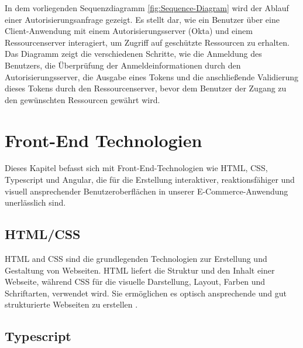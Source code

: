 In dem vorliegenden Sequenzdiagramm \ref{fig:Sequence-Diagram} wird der Ablauf einer Autorisierungsanfrage gezeigt. Es stellt dar, wie ein Benutzer über eine Client-Anwendung mit einem Autorisierungsserver (Okta) und einem Ressourcenserver interagiert, um Zugriff auf geschützte Ressourcen zu erhalten. \\
Das Diagramm zeigt die verschiedenen Schritte, wie die Anmeldung des Benutzers, die Überprüfung der Anmeldeinformationen durch den Autorisierungsserver, die Ausgabe eines Tokens und die anschließende Validierung dieses Tokens durch den Ressourcenserver, bevor dem Benutzer der Zugang zu den gewünschten Ressourcen gewährt wird.

\section{Front-End Technologien}

Dieses Kapitel befasst sich mit Front-End-Technologien wie HTML, CSS, Typescript und Angular, die für die Erstellung interaktiver, reaktionsfähiger und visuell ansprechender Benutzeroberflächen in unserer E-Commerce-Anwendung unerlässlich sind.

\subsection{HTML/CSS}

HTML and CSS sind die grundlegenden Technologien zur Erstellung und Gestaltung von Webseiten. HTML liefert die Struktur und den Inhalt einer Webseite, während CSS für die visuelle Darstellung, Layout, Farben und Schriftarten, verwendet wird. Sie ermöglichen es optisch ansprechende und gut strukturierte Webseiten zu erstellen \cite{HTML/CSS:2024}.

\subsection{Typescript}

